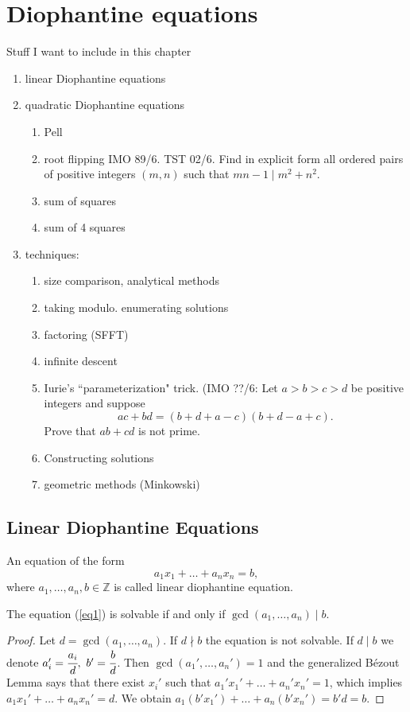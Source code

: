 \chapter{Diophantine equations}
Stuff I want to include in this chapter
\begin{enumerate}
\item linear Diophantine equations
\item quadratic Diophantine equations 
\begin{enumerate}
\item Pell
\item root flipping IMO 89/6. TST 02/6. Find in explicit form all ordered pairs of positive integers $(m,n)$ such that $mn-1\mid m^2+n^2$.
\item sum of squares
\item sum of 4 squares
\end{enumerate}
\item techniques:
\begin{enumerate}
\item
size comparison, analytical methods
\item
taking modulo. enumerating solutions
\item factoring (SFFT)
\item infinite descent 
\item Iurie's ``parameterization" trick. (IMO ??/6: Let $a>b>c>d$ be positive integers and suppose 
\[
ac+bd=(b+d+a-c)(b+d-a+c).
\]
Prove that $ab+cd$ is not prime.
\item Constructing solutions
\item
geometric methods (Minkowski)
\end{enumerate}
\end{enumerate}

\section{Linear Diophantine Equations}
An equation of the form
\begin{equation}
a_1 x_1+ \dots + a_n x_n =b, \label{eq1}
\end{equation}
where $a_1,\dots,a_n,b \in \mathbb{Z}$ is called linear diophantine
equation.

\begin{thm}
The equation (\ref{eq1}) is solvable if and only if
$\gcd(a_1,\dots,a_n)\mid b$.
\end{thm}

\begin{proof}
Let $d=\gcd(a_1,\dots,a_n)$. If $d\nmid b$ the equation is not
solvable. If $d\mid b$ we denote $a_i'=\cfrac{a_i}{d}, \
b'=\cfrac{b}{d}$. Then $\gcd(a_1',\dots,a_n')=1$ and the generalized
B\'{e}zout Lemma says that there exist $x_i'$ such that
$a_1'x_1'+\dots +a_n' x_n'=1$, which implies $a_1x_1'+\dots
+a_nx_n'=d$. We obtain $a_1(b'x_1')+\dots +a_n(b'x_n')=b'd=b.$
\end{proof}

